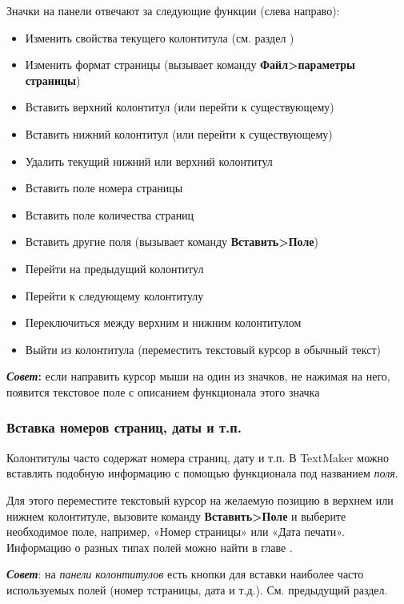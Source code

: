 ﻿\documentclass[a4paper,10pt]{article}
\begin{document}
Значки на панели отвечают за следующие функции (слева направо):
\begin{itemize}
 \item Изменить свойства текущего колонтитула (см. раздел )
 \item Изменить формат страницы (вызывает команду \textbf{Файл>параметры страницы})
 \item Вставить верхний колонтитул (или перейти к существующему)
 \item Вставить нижний колонтитул (или перейти к существующему)
 \item Удалить текущий нижний или верхний колонтитул
\item Вставить поле номера страницы
\item Вставить поле количества страниц
\item Вставить другие поля (вызывает команду \textbf{Вставить>Поле})
\item Перейти на предыдущий колонтитул
\item Перейти к следующему колонтитулу
\item Переключиться между верхним и нижним колонтитулом
\item Выйти из колонтитула (переместить текстовый курсор в обычный текст)
\end{itemize}

\begin{mdframed}[backgroundcolor=blue!10]
\textbf{\textit{Совет}:} если направить курсор мыши на один из значков, не нажимая на него, появится текстовое поле с описанием функционала этого значка
\end{mdframed}

\subsubsection{Вставка номеров страниц, даты и т.п.} \label{sec:вставканомеровстрдатыetc}
Колонтитулы часто содержат номера страниц, дату и т.п. В TextMaker можно вставлять подобную информацию с помощью функционала под названием \textit{поля}.

Для этого переместите текстовый курсор на желаемую позицию в верхнем или нижнем колонтитуле, вызовите команду \textbf{Вставить>Поле} и выберите необходимое поле, например, «Номер страницы» или «Дата печати». Информацию о разных типах полей можно найти в главе .

\textit{\textbf{Совет}}: на \textit{панели колонтитулов} есть кнопки для вставки наиболее часто используемых полей (номер тстраницы, дата и т.д.). См. предыдущий раздел.
\end{document}
